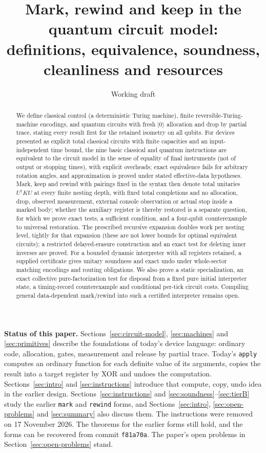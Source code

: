 \documentclass[11pt,a4paper]{article}
\title{Mark, rewind and keep in the quantum circuit model:\\
  definitions, equivalence, soundness, cleanliness and resources}
\author{Working draft}
\date{}
\theoremstyle{definition}
\theoremstyle{remark}
\newcommand{\ket}[1]{\lvert #1\rangle}
\newcommand{\earlierforms}{the earlier \texttt{mark} and \texttt{rewind} forms}
\begin{document}
\maketitle
\begin{abstract}
We define classical control (a deterministic Turing machine), finite
reversible-Turing-machine encodings, and quantum circuits with fresh
$\ket0$ allocation and drop by partial trace, stating every result first
for the retained isometry on all qubits. For devices presented as explicit
total classical circuits with finite capacities and an input-independent
time bound, the nine basic classical and quantum instructions are
equivalent to the circuit model in the sense of equality of final
instruments (not of output or stopping times), with explicit overheads;
exact equivalence fails for arbitrary rotation angles, and approximation
is proved under stated effective-data hypotheses. Mark, keep and rewind
with pairings fixed in the syntax then denote total unitaries
$U^\dagger KU$ at every finite nesting depth, with fixed total completions
and no allocation, drop, observed measurement, external console observation
or actual stop inside a marked body; whether
the auxiliary register is thereby restored is a separate question, for
which we prove exact tests, a sufficient condition, and a four-qubit
counterexample to universal restoration. The prescribed recursive
expansion doubles work per nesting level, tightly for that expansion
(these are not lower bounds for optimal equivalent circuits); a
restricted delayed-erasure construction and an exact test for deleting
inner inverses are proved. For a bounded dynamic interpreter with all
registers retained, a supplied certificate gives unitary soundness and
exact undo under whole-sector matching encodings and routing obligations.
We also prove a static specialization, an exact collective pure-factorization
test for disposal from a fixed pure initial interpreter state, a timing-record
counterexample and conditional per-tick circuit costs. Compiling general
data-dependent mark/rewind into such a certified interpreter remains open.
\end{abstract}

\noindent\textbf{Status of this paper.}
Sections~\ref{sec:circuit-model}, \ref{sec:machines} and \ref{sec:primitives}
describe the foundations of today's device language: ordinary code,
allocation, gates, measurement and release by partial trace.
Today's \texttt{apply} computes an ordinary function for each definite
value of its arguments, copies the result into a target register by XOR
and undoes the computation.
Sections~\ref{sec:intro} and \ref{sec:instructions} introduce that
compute, copy, undo idea in the earlier design.
Sections~\ref{sec:instructions} and \ref{sec:soundness}--\ref{sec:tierB}
study \earlierforms, and Sections~\ref{sec:intro}, \ref{sec:open-problems}
and \ref{sec:summary} also discuss them.
The instructions were removed on 17 November 2026. The theorems for the
earlier forms still hold, and the forms can be recovered from commit
\texttt{f81a70a}. The paper's open problems in Section~\ref{sec:open-problems}
stand.
\end{document}
